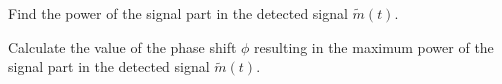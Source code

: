 \documentclass[fleqn]{article}
\begin{document}
\begin{question}
\begin{subquestion}{Find the power of the signal part in the detected signal $\tilde{m}(t)$.}
\end{subquestion}


\begin{subquestion}{Calculate the value of the phase shift $\phi$ resulting in the maximum power of the signal part in the detected signal $\tilde{m}(t)$.}
\answer{
\[ \cos(-2\pi f_{c}D-\phi) = 1 \quad \rightarrow \quad -2\pi f_{c}D-\phi=0 \quad \rightarrow \quad \boxed{\phi = -2\pi f_{c}D}   \]
}
\end{subquestion}

\end{question}

\end{document}
